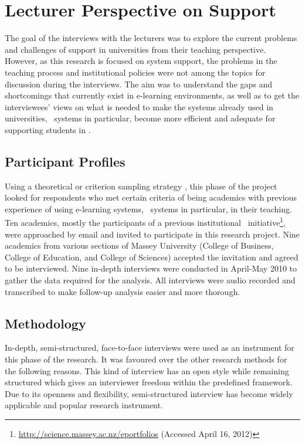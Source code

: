 \section{Lecturer Perspective on \LLLc Support}

The goal of the interviews with the lecturers was to explore the current
problems and challenges of \LLLs support in universities from their teaching
perspective. However, as this research is focused on system support, the
problems in the teaching process and institutional policies were not among the
topics for discussion during the interviews. The aim was to understand the gaps
and shortcomings that currently exist in e-learning environments, as well as to
get the interviewees' views on what is needed to make the systems already used
in universities, \ep~systems in particular, become more efficient and adequate
for supporting students in \LLLsn. 

\subsection{Participant Profiles}
Using a theoretical or criterion sampling strategy \citep{Byrne2001,
Warren2001}, this phase of the project looked for respondents who met certain
criteria of being academics with previous experience of using e-learning
systems, \ep~systems in particular, in their teaching. Ten academics, mostly the
participants of a previous institutional
\ep~initiative\footnote{\url{http://science.massey.ac.nz/eportfolios} (Accessed
April 16, 2012)}, were approached by email and invited to participate in this research project. Nine
academics from various sections of Massey University (College of Business,
College of Education, and College of Sciences) accepted the invitation and
agreed to be interviewed. Nine in-depth interviews were conducted in April-May
2010 to gather the data required for the analysis. All interviews were audio
recorded and transcribed to make follow-up analysis easier and more thorough.

\subsection{Methodology}

In-depth, semi-structured, face-to-face interviews were used as an instrument
for this phase of the research. It was favoured over the other research methods
for the following reasons. This kind of interview has an open style while
remaining structured \citep{Gillham2000} which gives an interviewer freedom
within the predefined framework. Due to its openness and flexibility,
semi-structured interview has become widely applicable and popular research
instrument.

